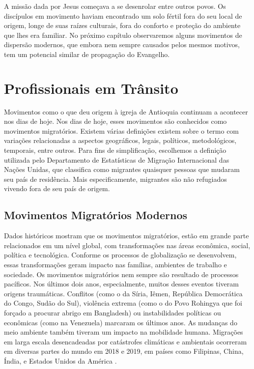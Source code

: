 \documentclass[12pt,openright,oneside,a4paper,
english,french,spanish,brazil]{abntex2}
\begin{document}
A missão dada por Jesus começava a se desenrolar entre outros povos. Os discípulos em movimento haviam encontrado um solo fértil fora do seu local de origem, longe de suas raízes culturais, fora do conforto e proteção do ambiente que lhes era familiar. No próximo capítulo observaremos alguns movimentos de dispersão modernos, que embora nem sempre causados pelos mesmos motivos, tem um potencial similar de propagação do Evangelho.

\chapter{Profissionais em Trânsito}

Movimentos como o que deu origem à igreja de Antioquia continuam a acontecer nos dias de hoje. Nos dias de hoje, esses movimentos são conhecidos como movimentos migratórios. Existem várias definições existem sobre o termo com variações relacionadas a aspectos geográficos, legais, políticos, metodológicos, temporais, entre outros\cite{iom2020}. Para fins de simplificação, escolhemos a definição utilizada pelo Departamento de Estatísticas de Migração Internacional das Nações Unidas, que classifica como migrantes quaisquer pessoas que mudaram seu país de residência. Mais especificamente, migrantes são não refugiados vivendo fora de seu país de origem. 

\section {Movimentos Migratórios Modernos}

Dados históricos mostram que os movimentos migratórios, estão em grande parte relacionados em um nível global, com transformações nas áreas econômica, social, política e tecnológica. Conforme os processos de globalização se desenvolvem, essas transformações geram impacto nas famílias, ambientes de trabalho e sociedade. Os movimentos migratórios nem sempre são resultado de processos pacíficos. Nos últimos dois anos, especialmente, muitos desses eventos tiveram origens traumáticas. Conflitos (como o da Síria, Iêmen, República Democrática do Congo, Sudão do Sul), violência extrema (como o do Povo Rohingya que foi forçado a procurar abrigo em Bangladesh) ou instabilidades políticas ou econômicas (como na Venezuela) marcaram os últimos anos. As mudanças do meio ambiente também tiveram um impacto na mobilidade humana. Migrações em larga escala desencadeadas por catástrofes climáticas e ambientais ocorreram em diversas partes do mundo em 2018 e 2019, em países como Filipinas, China, Índia, e Estados Unidos da América \cite[p. 19]{iom2020}.
\end{document}
